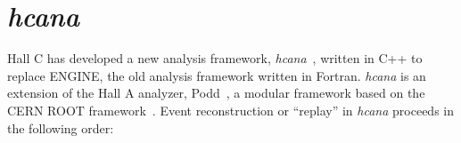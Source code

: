 \section{\textit{hcana}}
Hall C has developed a new analysis framework,
\textit{hcana}~\cite{hcana_github}, written in C++ to replace ENGINE, the old
analysis framework written in Fortran.
\textit{hcana} is an extension of the Hall A analyzer, Podd~\cite{podd_github},
a modular framework based on the CERN ROOT framework~\cite{cenr_root}.
Event reconstruction or ``replay'' in \textit{hcana} proceeds in the following order:

